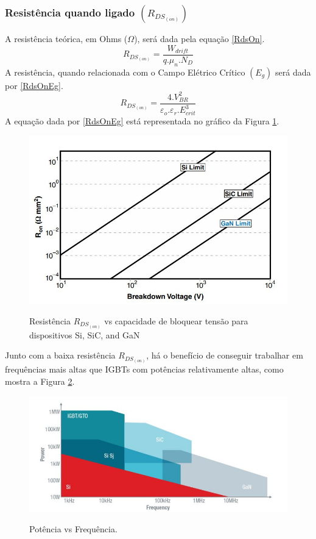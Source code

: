 \subsubsection{Resistência quando ligado $(R_{DS_{(on)}})$}
A resistência teórica, em Ohms ($\Omega$), será dada pela equação \ref{RdsOn}. \cite{lidow_rooij_strydom_reusch_glaser_2020}
\begin{equation}
    R_{DS_{(on)}} = \frac{W_{drift}}{q.\mu_n .N_D}
    \label{RdsOn}
\end{equation}
A resistência, quando relacionada com o Campo Elétrico Crítico $(E_g)$ será dada por \ref{RdsOnEg}. \cite{lidow_rooij_strydom_reusch_glaser_2020}
\begin{equation}
    R_{DS_{(on)}} = \frac{4.V^2_{BR}}{\varepsilon_o .\varepsilon_r . E^3_{crit}}
    \label{RdsOnEg}
\end{equation}
A equação dada por \ref{RdsOnEg} está representada no gráfico da Figura \ref{FigRDSon}.
\begin{figure}[H]
\caption{Resistência $R_{DS_(on)}$ vs capacidade de bloquear tensão para dispositivos Si, SiC, and GaN \cite{lidow_rooij_strydom_reusch_glaser_2020}}
 \centering %
\includegraphics[width=14cm]{figuras/5.JPG} 
\label{FigRDSon}
\end{figure}
\noindent Junto com a baixa resistência $R_{DS_(on)}$, há o benefício de conseguir trabalhar em frequências mais altas que IGBTs com potências relativamente altas, como mostra a Figura \ref{FigComparison}. 
\begin{figure}[H]
\caption{Potência vs Frequência. \cite{Sameer}}
 \centering %
\includegraphics[width=15cm]{figuras/6.JPG} 
\label{FigComparison}
\end{figure}





